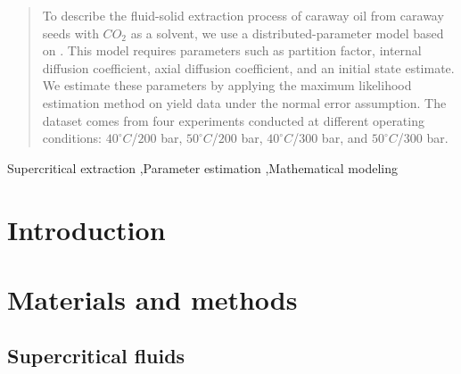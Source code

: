 \documentclass[a4paper,fleqn]{cas-dc}
\begin{document}
\begin{abstract}
To describe the fluid-solid extraction process of caraway oil from caraway seeds with $CO_2$ as a solvent, we use a distributed-parameter model based on \citet{Reverchon1996}. This model requires parameters such as partition factor, internal diffusion coefficient, axial diffusion coefficient, and an initial state estimate. We estimate these parameters by applying the maximum likelihood estimation method on yield data under the normal error assumption.
The dataset comes from four experiments conducted at different operating conditions: $40^\circ C$/$200$ bar, $50^\circ C$/$200$ bar, $40^\circ C$/$300$ bar, and $50^\circ C$/$300$ bar.

\end{abstract}

\begin{keywords}
Supercritical extraction \sep Parameter estimation \sep Mathematical modeling
\end{keywords}

\maketitle


\section{Introduction}
%


\section{Materials and methods} \label{CH: Materials and methods}

\subsection{Supercritical fluids} \label{CH: Thermodynamic}
%


%
\end{document}
